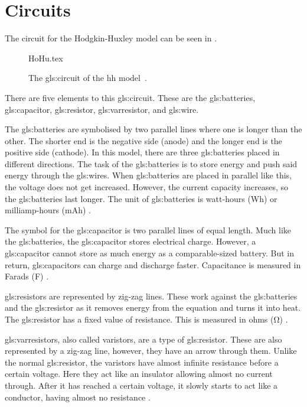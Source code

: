 \documentclass[class={myRUCProject}, crop=false]{standalone}
\begin{document}
 
 

\section{Circuits}
The circuit for the Hodgkin-Huxley model can be seen in . 

\begin{figure}[ht]
    \centering
    {HoHu.tex}
    \caption{The \gls{gls:circuit} of the \gls{hh} model~\cite{HodHux1952}.}\label{fig:HHcircuit}
\end{figure}
There are five elements to this \gls{gls:circuit}. These are the \gls{gls:batteries}, \gls{gls:capacitor}, \gls{gls:resistor}, \gls{gls:varresistor}, and \gls{gls:wire}. 

The \gls{gls:batteries} are symbolised by two parallel lines where one is longer than the other. The shorter end is the negative side (anode) and the longer end is the positive side (cathode). In this model, there are three \gls{gls:batteries} placed in different directions. The task of the \gls{gls:batteries} is to store energy and push said energy through the \glspl{gls:wire}. When \gls{gls:batteries} are placed in parallel like this, the voltage does not get increased. However, the current capacity increases, so the \gls{gls:batteries} last longer. The unit of \gls{gls:batteries} is watt-hours (Wh) or milliamp-hours (mAh) \cite{}. 

The symbol for the \gls{gls:capacitor} is two parallel lines of equal length. Much like the \gls{gls:batteries}, the \gls{gls:capacitor} stores electrical charge. However, a \gls{gls:capacitor} cannot store as much energy as a comparable-sized battery. But in return, \gls{gls:capacitor}s can charge and discharge faster. Capacitance is measured in Farads (\unit{\farad}) \cite{}.

\Gls{gls:resistor}s are represented by zig-zag lines. These work against the \gls{gls:batteries} and the \gls{gls:resistor} as it removes energy from the equation and turns it into heat. The \gls{gls:resistor} has a fixed value of resistance. This is measured in ohms (\unit{\ohm}) \cite{}.

\Glspl{gls:varresistor}, also called varistors, are a type of \gls{gls:resistor}. These are also represented by a zig-zag line, however, they have an arrow through them. Unlike the normal \gls{gls:resistor}, the varistors have almost infinite resistance before a certain voltage. Here they act like an insulator allowing almost no current through. After it has reached a certain voltage, it slowly starts to act like a conductor, having almost no resistance \cite{}. 
\end{document}
